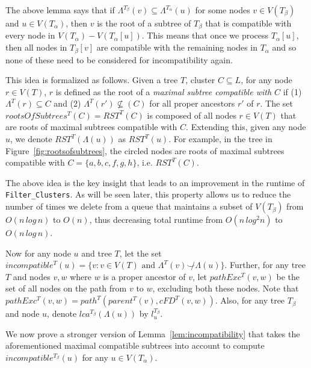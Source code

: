 \documentclass{article}
\newcommand{\compatible}{\smile}
\newcommand{\leafset}{\Lambda}
\newcommand{\TA}{T_\alpha}
\newcommand{\TB}{T_\beta}
\begin{document}
    The above lemma says that if $\leafset^{\TB}(v) \subseteq \leafset^{\TA}(u)$ for some nodes $v \in V(\TB)$ and $u \in V(\TA)$, then $v$ is the root of a subtree of $\TB$ that is compatible with every node in $V(\TA) - V(\TA[u])$. This means that once we process $\TA[u]$, then all nodes in $\TB[v]$ are compatible with the remaining nodes in $\TA$ and so none of these need to be considered for incompatibility again.

    This idea is formalized as follows. Given a tree $T$, cluster $C \subseteq L$, for any node $r \in V(T)$, $r$ is defined as the root of a \textit{maximal subtree compatible with $C$} if (1) $\leafset^T(r) \subseteq C$ and (2) $\leafset^T(r') \not\subseteq(C)$ for all proper ancestors $r'$ of $r$. The set $rootsOfSubtrees^{T}(C) = RST^{T}(C)$ is composed of all nodes $r \in V(T)$ that are roots of maximal subtrees compatible with $C$. Extending this, given any node $u$, we denote $RST^{T}(\leafset(u))$ as $RST^{T}(u)$. For example, in the tree in Figure~\ref{fig:rootsofsubtrees}, the circled nodes are roots of maximal subtrees compatible with $C = \{a, b, c, f, g, h\}$, i.e. $RST^{T}(C)$.

    The above idea is the key insight that leads to an improvement in the runtime of \texttt{Filter\_Clusters}. As will be seen later, this property allows us to reduce the number of times we delete from a queue that maintains a subset of $V(\TB)$ from $O(n\,log\,n)$ to $O(n)$, thus decreasing total runtime from $O(n\,log^2n)$ to $O(n\,log\,n)$.

    Now for any node $u$ and tree $T$, let the set $incompatible^T(u) = \{v : v \in V(T) \text{ and } \leafset^T(v) \not\compatible \leafset(u)\}$. Further, for any tree $T$ and nodes $v, w$ where $w$ is a proper ancestor of $v$, let $pathExc^T(v, w)$ be the set of all nodes on the path from $v$ to $w$, excluding both these nodes. Note that $pathExc^T(v, w) = path^T(parent^T(v), cFD^T(v, w))$. Also, for any tree $\TB$ and node $u$, denote $lca^{\TB}(\leafset(u))$ by $l_u^{\TB}$.

    We now prove a stronger version of Lemma~\ref{lem:incompatibility} that takes the aforementioned maximal compatible subtrees into account to compute $incompatible^{\TB}(u)$ for any $u \in V(\TA)$.
    \newline
\end{document}

